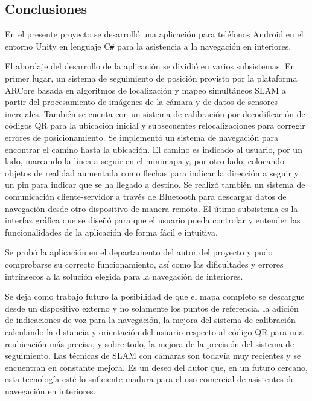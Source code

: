 \documentclass{article}
\newenvironment{standalone}{\begin{preview}}{\end{preview}}
\begin{document}
\begin{standalone}

\section{Conclusiones}

En el presente proyecto se desarrolló una aplicación para teléfonos Android en el entorno Unity en lenguaje C\texttt{\#} para la asistencia a la navegación en interiores.

El abordaje del desarrollo de la aplicación se dividió en varios subsistemas. En primer lugar, un sistema de seguimiento de posición provisto por la plataforma ARCore basada en algoritmos de localización y mapeo simultáneos SLAM a partir del procesamiento de imágenes de la cámara y de datos de sensores inerciales.
También se cuenta con un sistema de calibración por decodificación de códigos QR para la ubicación inicial y subsecuentes relocalizaciones para corregir errores de posicionamiento.
Se implementó un sistema de navegación para encontrar el camino hasta la ubicación.
El camino es indicado al usuario, por un lado, marcando la línea a seguir en el minimapa y, por otro lado, colocando objetos de realidad aumentada como flechas para indicar la dirección a seguir y un pin para indicar que se ha llegado a destino.
Se realizó también un sistema de comunicación cliente-servidor a través de Bluetooth para descargar datos de navegación desde otro dispositivo de manera remota.
El útimo subsistema es la interfaz gráfica que se diseñó para que el usuario pueda controlar y entender las funcionalidades de la aplicación de forma fácil e intuitiva.

Se probó la aplicación en el departamento del autor del proyecto y pudo comprobarse su correcto funcionamiento, así como las dificultades y errores intrínsecos a la solución elegida para la navegación de interiores.

Se deja como trabajo futuro la posibilidad de que el mapa completo se descargue desde un dispositivo externo y no solamente los puntos de referencia, la adición de indicaciones de voz para la navegación, la mejora del sistema de calibración calculando la distancia y orientación del usuario respecto al código QR para una reubicación más precisa, y sobre todo, la mejora de la precisión del sistema de seguimiento.
Las técnicas de SLAM con cámaras son todavía muy recientes y se encuentran en constante mejora.
Es un deseo del autor que, en un futuro cercano, esta tecnología esté lo suficiente madura para el uso comercial de asistentes de navegación en interiores.

\end{standalone}
\end{document}
